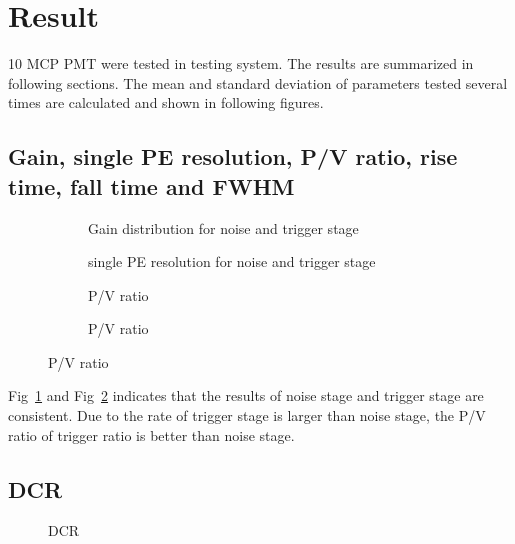 \section{Result}
\label{Result}
10 MCP PMT were tested in testing system. The results are summarized in following sections. The mean and standard deviation of parameters tested several times are calculated and shown in following figures.

\subsection{Gain, single PE resolution, P/V ratio, rise time, fall time and FWHM}
\begin{figure}[!htbp]
    \centering
    \begin{subfigure}[b]{0.47\textwidth}
        \caption{Gain distribution for noise and trigger stage}
        \label{fig:gainCompare}
    \end{subfigure}
    \begin{subfigure}[b]{0.47\textwidth}
        \caption{single PE resolution for noise and trigger stage}
        \label{fig:speresolutionCompare}
    \end{subfigure}
    \begin{subfigure}[b]{0.47\textwidth}
        \caption{P/V ratio}
        \label{fig:PVCompare}
    \end{subfigure}
    \begin{subfigure}[b]{0.47\textwidth}
        \caption{P/V ratio}
        \label{fig:FWHMCompare}
    \end{subfigure}
\end{figure}
Fig~\ref{fig:gainCompare} and Fig~\ref{fig:speresolutionCompare} indicates that the results of noise stage and trigger stage are consistent. Due to the rate of trigger stage is larger than noise stage, the P/V ratio of trigger ratio is better than noise stage.

\subsection{DCR}
\begin{figure}[!htbp]
    \centering
    \caption{DCR}
    \label{fig:DCRCompare}
\end{figure}

